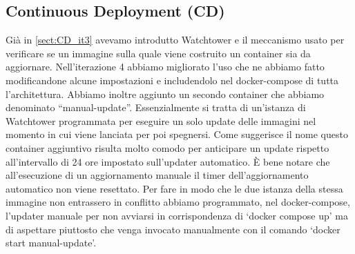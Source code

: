 \subsection{Continuous Deployment (CD)}
\label{subsect:CD_it2}
Già in \ref{sect:CD_it3} avevamo introdutto Watchtower e il meccanismo usato per verificare se un immagine sulla quale viene costruito un container sia da aggiornare. Nell'iterazione 4 abbiamo migliorato l'uso che ne abbiamo fatto modificandone alcune impostazioni e includendolo nel docker-compose di tutta l'architettura. Abbiamo inoltre aggiunto un secondo container che abbiamo denominato ``manual-update''. Essenzialmente si tratta di un'istanza di Watchtower programmata per eseguire un solo update delle immagini nel momento in cui viene lanciata per poi spegnersi. Come suggerisce il nome questo container aggiuntivo risulta molto comodo per anticipare un update rispetto all'intervallo di 24 ore impostato sull'updater automatico. È bene notare che all'esecuzione di un aggiornamento manuale il timer dell'aggiornamento automatico non viene resettato. Per fare in modo che le due istanza della stessa immagine non entrassero in conflitto abbiamo programmato, nel docker-compose, l'updater manuale per non avviarsi in corrispondenza di `docker compose up' ma di aspettare piuttosto che venga invocato manualmente con il comando `docker start manual-update'.
